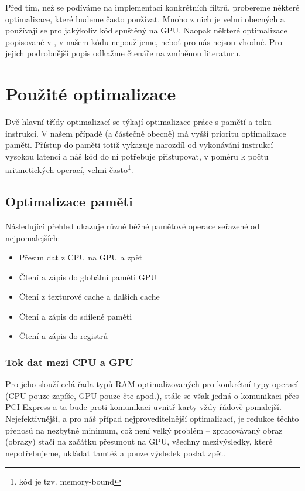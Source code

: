 
Před tím, než se podíváme na implementaci konkrétních filtrů, probereme některé optimalizace, které budeme často používat. Mnoho z nich je velmi obecných a používají se pro jakýkoliv kód spuštěný na GPU. Naopak některé optimalizace popisované v \cite{CUDA programming g.}, \cite{CUDA best practices} v našem kódu nepoužijeme, neboť pro nás nejsou vhodné. Pro jejich podrobnější popis odkažme čtenáře na zmíněnou literaturu.

\section{Použité optimalizace}
    
    Dvě hlavní třídy optimalizací se týkají optimalizace práce s pamětí a toku instrukcí. V našem případě (a částečně obecně) má vyšší prioritu optimalizace paměti. Přístup do paměti totiž vykazuje narozdíl od vykonávání instrukcí vysokou latenci a náš kód do ní potřebuje přistupovat, v poměru k počtu aritmetických operací, velmi často\footnote{kód je tzv. memory-bound}.
    
    \subsection{Optimalizace paměti}
    
        Následující přehled ukazuje různé běžné paměťové operace seřazené od nejpomalejších:
    \begin{itemize}
      \item Přesun dat z CPU na GPU a zpět
      \item Čtení a zápis do globální paměti GPU
      \item Čtení z texturové cache a dalších cache
      \item Čtení a zápis do sdílené paměti
      \item Čtení a zápis do registrů
    \end{itemize}
    
        \subsubsection{Tok dat mezi CPU a GPU}
        
        Pro jeho slouží celá řada typů RAM optimalizovaných pro konkrétní typy operací (CPU pouze zapíše, GPU pouze čte apod.), stále se však jedná o komunikaci přes PCI Express a ta bude proti komunikaci uvnitř karty vždy řádově pomalejší. Nejefektivnější, a pro náš případ nejproveditelnější optimalizací, je redukce těchto přenosů na nezbytné minimum, což není velký problém -- zpracovávaný obraz (obrazy) stačí na začátku přesunout na GPU, všechny mezivýsledky, které nepotřebujeme, ukládat tamtéž a pouze výsledek poslat zpět.
        
